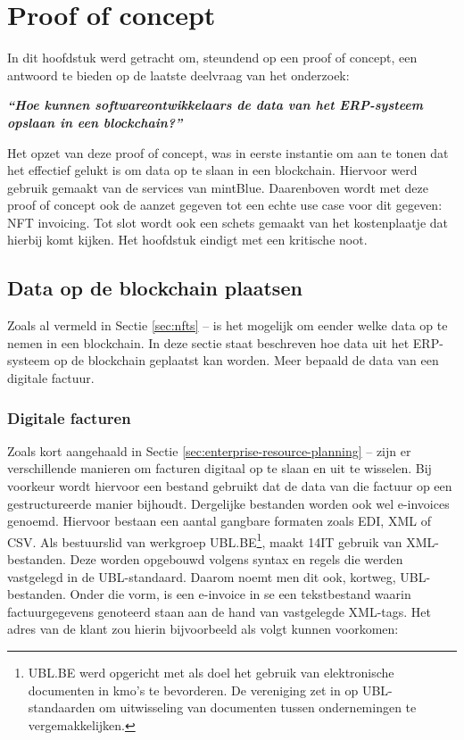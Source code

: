 \chapter{Proof of concept}
\label{ch:proof-of-concept}



In dit hoofdstuk werd getracht om, steundend op een proof of concept, een antwoord te bieden op de laatste deelvraag van het onderzoek:

\begin{center}
	\textit{\textbf{``Hoe kunnen softwareontwikkelaars de data van het ERP-systeem opslaan in een blockchain?''}}
\end{center}

Het opzet van deze proof of concept, was in eerste instantie om aan te tonen dat het effectief gelukt is om data op te slaan in een blockchain. Hiervoor werd gebruik gemaakt van de services van mintBlue. Daarenboven wordt met deze proof of concept ook de aanzet gegeven tot een echte use case voor dit gegeven: NFT invoicing. Tot slot wordt ook een schets gemaakt van het kostenplaatje dat hierbij komt kijken. Het hoofdstuk eindigt met een kritische noot.


\section{Data op de blockchain plaatsen}
\label{sec:data-op-de-blockchain-plaatsen}

Zoals al vermeld in Sectie \ref{sec:nfts} --  is het mogelijk om eender welke data op te nemen in een blockchain. In deze sectie staat beschreven hoe data uit het ERP-systeem op de blockchain geplaatst kan worden. Meer bepaald de data van een digitale factuur.

\subsection{Digitale facturen}
\label{sub:digitale-facturen}

Zoals kort aangehaald in Sectie \ref{sec:enterprise-resource-planning} --  zijn er verschillende manieren om facturen digitaal op te slaan en uit te wisselen.
Bij voorkeur wordt hiervoor een bestand gebruikt dat de data van die factuur op een gestructureerde manier bijhoudt. Dergelijke bestanden worden ook wel e-invoices genoemd. Hiervoor bestaan een aantal gangbare formaten zoals EDI, XML of CSV. Als bestuurslid van werkgroep UBL.BE\footnote{UBL.BE werd opgericht met als doel het gebruik van elektronische documenten in kmo's te bevorderen. De vereniging zet in op UBL-standaarden om uitwisseling van documenten tussen ondernemingen te vergemakkelijken.}, maakt 14IT gebruik van XML-bestanden. Deze worden opgebouwd volgens syntax en regels die werden vastgelegd in de UBL-standaard. Daarom noemt men dit ook, kortweg, UBL-bestanden. Onder die vorm, is een e-invoice in se een tekstbestand waarin factuurgegevens genoteerd staan aan de hand van vastgelegde XML-tags. Het adres van de klant zou hierin bijvoorbeeld als volgt kunnen voorkomen:

